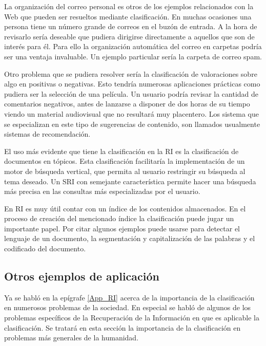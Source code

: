 \documentclass{llncs}
\begin{document}
		La organizaci\'on del correo personal es otros de los ejemplos relacionados con la Web que pueden ser resueltos mediante clasificaci\'on. En muchas ocasiones una persona tiene un n\'umero grande de correos en el buz\'on de entrada. A la hora de revisarlo ser\'ia deseable que pudiera dirigirse directamente a aquellos que son de inter\'es para \'el. Para ello la organizaci\'on autom\'atica del correo en carpetas podr\'ia ser una ventaja invaluable. Un ejemplo particular ser\'ia la carpeta de correo spam.
		
		Otro problema que se pudiera resolver ser\'ia la clasificaci\'on de valoraciones sobre algo en positivas o negativas. Esto tendr\'ia numerosas aplicaciones pr\'acticas como pudiera ser la selecci\'on de una pel\'icula. Un usuario podr\'ia revisar la cantidad de comentarios negativos, antes de lanzarse a disponer de dos horas de su tiempo viendo un material audiovisual que no resultar\'a muy placentero. Los sistema que se especializan en este tipo de sugerencias de contenido, son llamados usualmente sistemas de recomendaci\'on.
		
		El uso m\'as evidente que tiene la clasificaci\'on en la RI es la clasificaci\'on de documentos en t\'opicos. Esta clasificaci\'on facilitar\'ia la implementaci\'on de un motor de b\'usqueda vertical, que permita al usuario restringir su b\'usqueda al tema deseado. Un SRI con semejante caracter\'istica permite hacer una b\'usqueda m\'as precisa en las consultas m\'as especializadas por el usuario.
		
		En RI es muy \'util contar con un \'indice de los contenidos almacenados. En el proceso de creaci\'on del mencionado \'indice la clasificaci\'on puede jugar un importante papel. Por citar algunos ejemplos puede usarse para detectar el lenguaje de un documento, la segmentaci\'on y capitalizaci\'on de las palabras y el codificado del documento.
		

	\subsection{Otros ejemplos de aplicaci\'on}

Ya se habl\'o en la ep\'igrafe \ref{App_RI} acerca de la importancia de la clasificaci\'on en numerosos problemas de la sociedad. En especial se habl\'o de algunos de los problemas espec\'ificos de la Recuperaci\'on de la Informaci\'on en que es aplicable la clasificaci\'on. Se tratar\'a en esta secci\'on la importancia de la clasificaci\'on en problemas m\'as generales de la humanidad.
\end{document}
